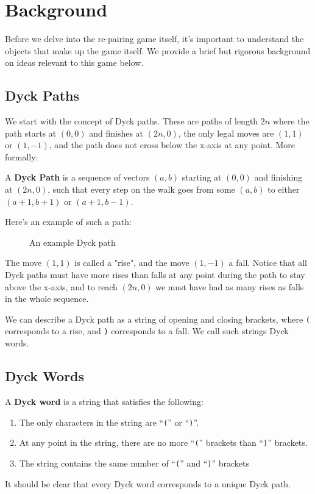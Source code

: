 \section{Background}
Before we delve into the re-pairing game itself, it's important to understand the objects that make up the game itself. We provide a brief but rigorous background on ideas relevant to this game below.

\subsection{Dyck Paths}
We start with the concept of Dyck paths. These are paths of length $2n$ where the path starts at $(0,0)$ and finishes at $(2n,0)$, the only legal moves are $(1,1)$ or $(1,-1)$, and the path does not cross below the x-axis at any point. More formally:

\begin{definition}
    A \textbf{Dyck Path} is a sequence of vectors $(a,b)$ starting at $(0,0)$ and finishing at $(2n,0)$, such that every step on the walk goes from some $(a,b)$ to either $(a+1,b+1)$ or $(a+1,b-1)$.
\end{definition}

Here's an example of such a path:

\begin{figure}[H]
    \centering
    
    \caption{An example Dyck path}
    \label{fig:dyckPath}
\end{figure}
The move $(1,1)$ is called a "rise", and the move $(1,-1)$ a fall. Notice that all Dyck paths must have more rises than falls at any point during the path to stay above the x-axis, and to reach $(2n,0)$ we must have had as many rises as falls in the whole sequence. 

We can describe a Dyck path as a string of opening and closing brackets, where \texttt{(} corresponds to a rise, and \texttt{)} corresponds to a fall. We call such strings Dyck words.

\subsection{Dyck Words}
\begin{definition}
    A \textbf{Dyck word} is a string that satisfies the following:
    \begin{enumerate}
        \item The only characters in the string are ``\texttt{(}'' or ``\texttt{)}''.
        \item At any point in the string, there are no more ``\texttt{(}'' brackets than ``\texttt{)}'' brackets.
        \item The string contains the same number of ``\texttt{(}'' and ``\texttt{)}'' brackets
    \end{enumerate}
\end{definition}
It should be clear that every Dyck word corresponds to a unique Dyck path.

